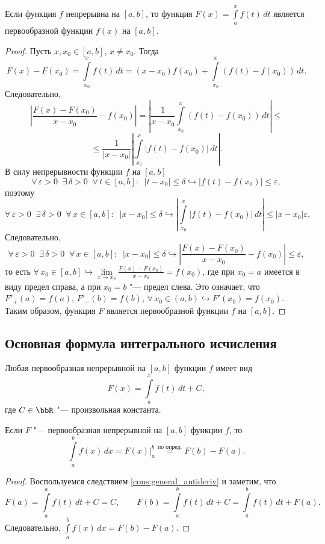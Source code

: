 \begin{thm} \label{th:int_antideriv}
Если функция $f$ непрерывна на $[a, b]$, то функция $F(x) = \int\limits_a^x f(t)\,dt$ является первообразной функции $f(x)$ на $[a, b]$.
\end{thm}

\begin{proof}
Пусть $x, x_0 \in [a, b]$, $x \ne x_0$. Тогда
$$
F(x) - F(x_0) = \int\limits_{x_0}^x f(t)\,dt = (x - x_0)f(x_0) + \int\limits_{x_0}^x (f(t) - f(x_0))\,dt.
$$
Следовательно,
$$
\left| \frac{F(x) - F(x_0)}{x - x_0} - f(x_0) \right| = \left| \frac{1}{x - x_0} \int\limits_{x_0}^x (f(t) - f(x_0))\,dt \right| \le
$$
$$
\le \frac{1}{|x - x_0|} \left| \int\limits_{x_0}^x |f(t) - f(x_0)|\,dt \right|.
$$
В силу непрерывности функции $f$ на $[a, b]$
$$
\forall\, \varepsilon > 0 \;\; \exists\, \delta > 0 \;\; \forall\, t \in [a, b] \colon \;\; |t - x_0| \le \delta \hookrightarrow |f(t) - f(x_0)| \le \varepsilon,
$$
поэтому
$$
\forall\, \varepsilon > 0 \;\; \exists\, \delta > 0 \;\; \forall\, x \in [a, b] \colon \;\; |x - x_0| \le \delta \hookrightarrow \left| \int\limits_{x_0}^x |f(t) - f(x_0)|\,dt \right| \le |x - x_0|\varepsilon.
$$
Следовательно,
$$
\forall\, \varepsilon > 0 \;\; \exists\, \delta > 0 \;\; \forall\, x \in [a, b] \colon \;\; |x - x_0| \le \delta \hookrightarrow \left| \frac{F(x) - F(x_0)}{x - x_0} - f(x_0) \right| \le \varepsilon,
$$
то есть $\forall\, x_0 \in [a, b] \hookrightarrow \lim\limits_{x \to x_0} \frac{F(x) - F(x_0)}{x - x_0} = f(x_0)$, где при $x_0 = a$ имеется в виду предел справа, а при $x_0 = b$ "--- предел слева. Это означает, что $F'_+(a) = f(a)$, $F'_-(b) = f(b)$, $\forall\, x_0 \in (a, b) \hookrightarrow F'(x_0) = f(x_0)$. Таким образом, функция $F$ является первообразной функции $f$ на $[a, b]$.
\end{proof}


\subsection{Основная формула интегрального исчисления}

\begin{cons} \label{cons:general_antideriv}
Любая первообразная непрерывной на $[a, b]$ функции $f$ имеет вид
$$
F(x) = \int\limits_a^x f(t)\,dt + C,
$$
где $C \in \bbR$ "--- произвольная константа.
\end{cons}

\begin{cons} \label{cons:newton_leibniz}
Если $F$ "--- первообразная непрерывной на $[a, b]$ функции $f$, то
$$
\int\limits_a^b f(x)\,dx = F(x) \bigg|_a^b \stackrel{\text{по опред.}}{=} F(b) - F(a).
$$
\end{cons}

\begin{proof}
Воспользуемся следствием \ref{cons:general_antideriv} и заметим, что
$$
F(a) = \int\limits_a^a f(t)\,dt + C = C, \qquad F(b) = \int\limits_a^b f(t)\,dt + C = \int\limits_a^b f(t)\,dt + F(a).
$$
Следовательно, $\int\limits_a^b f(x)\,dx = F(b) - F(a)$.
\end{proof}